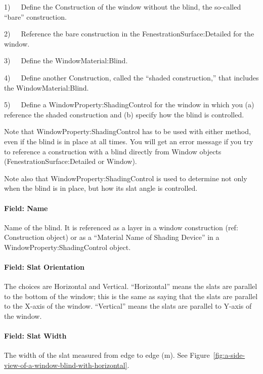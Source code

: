 1)~~~Define the Construction of the window without the blind, the so-called ``bare'' construction.

2)~~~Reference the bare construction in the FenestrationSurface:Detailed for the window.

3)~~~Define the WindowMaterial:Blind.

4)~~~Define another Construction, called the ``shaded construction,'' that includes the WindowMaterial:Blind.

5)~~~Define a WindowProperty:ShadingControl for the window in which you (a) reference the shaded construction and (b) specify how the blind is controlled.

Note that WindowProperty:ShadingControl has to be used with either method, even if the blind is in place at all times. You will get an error message if you try to reference a construction with a blind directly from Window objects (FenestrationSurface:Detailed or Window).

Note also that WindowProperty:ShadingControl is used to determine not only when the blind is in place, but how its slat angle is controlled.

\paragraph{Field: Name}\label{field-name-17-007}

Name of the blind. It is referenced as a layer in a window construction (ref: Construction object) or as a ``Material Name of Shading Device'' in a WindowProperty:ShadingControl object.

\paragraph{Field: Slat Orientation}\label{field-slat-orientation}

The choices are Horizontal and Vertical. ``Horizontal'' means the slats are parallel to the bottom of the window; this is the same as saying that the slats are parallel to the X-axis of the window. ``Vertical'' means the slats are parallel to Y-axis of the window.

\paragraph{Field: Slat Width}\label{field-slat-width}

The width of the slat measured from edge to edge (m). See Figure~\ref{fig:a-side-view-of-a-window-blind-with-horizontal}.

